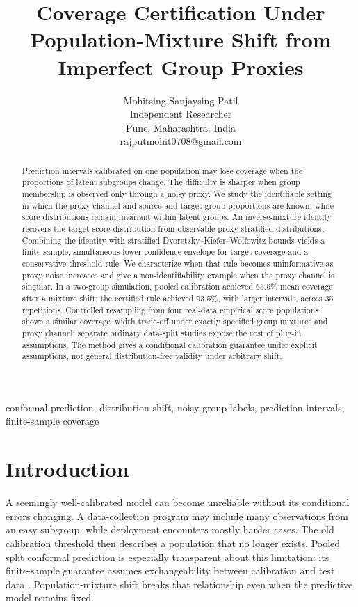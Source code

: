 \documentclass[twoside,11pt]{article}
\begin{document}
\title{Coverage Certification Under Population-Mixture Shift from Imperfect Group Proxies}
\author{\name Mohitsing Sanjaysing Patil \\
\addr Independent Researcher\\
Pune, Maharashtra, India\\
\addr rajputmohit0708@gmail.com}
\maketitle
\begin{abstract}%
Prediction intervals calibrated on one population may lose coverage when the proportions of latent subgroups change. The difficulty is sharper when group membership is observed only through a noisy proxy. We study the identifiable setting in which the proxy channel and source and target group proportions are known, while score distributions remain invariant within latent groups. An inverse-mixture identity recovers the target score distribution from observable proxy-stratified distributions. Combining the identity with stratified Dvoretzky--Kiefer--Wolfowitz bounds yields a finite-sample, simultaneous lower confidence envelope for target coverage and a conservative threshold rule. We characterize when that rule becomes uninformative as proxy noise increases and give a non-identifiability example when the proxy channel is singular. In a two-group simulation, pooled calibration achieved 65.5\% mean coverage after a mixture shift; the certified rule achieved 93.5\%, with larger intervals, across 35 repetitions. Controlled resampling from four real-data empirical score populations shows a similar coverage--width trade-off under exactly specified group mixtures and proxy channel; separate ordinary data-split studies expose the cost of plug-in assumptions. The method gives a conditional calibration guarantee under explicit assumptions, not general distribution-free validity under arbitrary shift.
\end{abstract}
\begin{keywords}
conformal prediction, distribution shift, noisy group labels, prediction intervals, finite-sample coverage
\end{keywords}

\section{Introduction}
A seemingly well-calibrated model can become unreliable without its conditional errors changing. A data-collection program may include many observations from an easy subgroup, while deployment encounters mostly harder cases. The old calibration threshold then describes a population that no longer exists. Pooled split conformal prediction is especially transparent about this limitation: its finite-sample guarantee assumes exchangeability between calibration and test data \citep{vovk2005,angelopoulos2023}. Population-mixture shift breaks that relationship even when the predictive model remains fixed.
\end{document}
